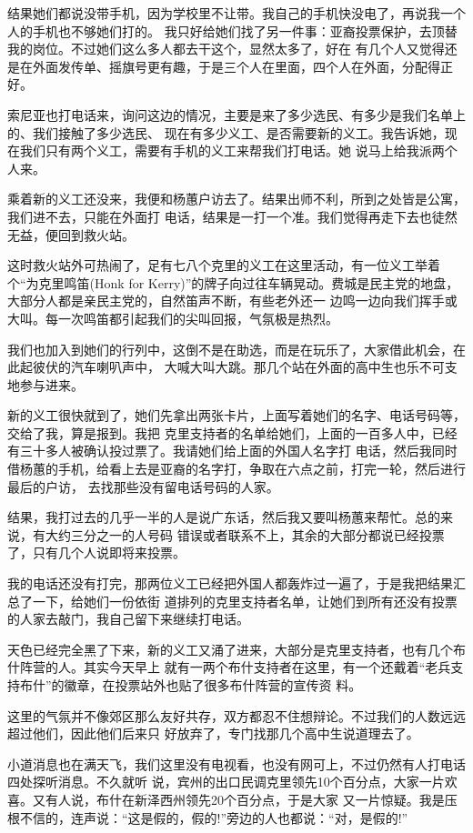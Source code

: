 ﻿\documentclass[11pt]{article}
\begin{document}
结果她们都说没带手机，因为学校里不让带。我自己的手机快没电了，再说我一个人的手机也不够她们打的。
我只好给她们找了另一件事：亚裔投票保护，去顶替我的岗位。不过她们这么多人都去干这个，显然太多了，好在
有几个人又觉得还是在外面发传单、摇旗号更有趣，于是三个人在里面，四个人在外面，分配得正好。

索尼亚也打电话来，询问这边的情况，主要是来了多少选民、有多少是我们名单上的、我们接触了多少选民、
现在有多少义工、是否需要新的义工。我告诉她，现在我们只有两个义工，需要有手机的义工来帮我们打电话。她
说马上给我派两个人来。

乘着新的义工还没来，我便和杨蕙户访去了。结果出师不利，所到之处皆是公寓，我们进不去，只能在外面打
电话，结果是一打一个准。我们觉得再走下去也徒然无益，便回到救火站。

这时救火站外可热闹了，足有七八个克里的义工在这里活动，有一位义工举着个``为克里鸣笛(Honk for
Kerry)''的牌子向过往车辆晃动。费城是民主党的地盘，大部分人都是亲民主党的，自然笛声不断，有些老外还一
边鸣一边向我们挥手或大叫。每一次鸣笛都引起我们的尖叫回报，气氛极是热烈。


我们也加入到她们的行列中，这倒不是在助选，而是在玩乐了，大家借此机会，在此起彼伏的汽车喇叭声中，
大喊大叫大跳。那几个站在外面的高中生也乐不可支地参与进来。

新的义工很快就到了，她们先拿出两张卡片，上面写着她们的名字、电话号码等，交给了我，算是报到。我把
克里支持者的名单给她们，上面的一百多人中，已经有三十多人被确认投过票了。我请她们给上面的外国人名字打
电话，然后我同时借杨蕙的手机，给看上去是亚裔的名字打，争取在六点之前，打完一轮，然后进行最后的户访，
去找那些没有留电话号码的人家。

结果，我打过去的几乎一半的人是说广东话，然后我又要叫杨蕙来帮忙。总的来说，有大约三分之一的人号码
错误或者联系不上，其余的大部分都说已经投票了，只有几个人说即将来投票。

我的电话还没有打完，那两位义工已经把外国人都轰炸过一遍了，于是我把结果汇总了一下，给她们一份依街
道排列的克里支持者名单，让她们到所有还没有投票的人家去敲门，我自己留下来继续打电话。

天色已经完全黑了下来，新的义工又涌了进来，大部分是克里支持者，也有几个布什阵营的人。其实今天早上
就有一两个布什支持者在这里，有一个还戴着``老兵支持布什''的徽章，在投票站外也贴了很多布什阵营的宣传资
料。

这里的气氛并不像郊区那么友好共存，双方都忍不住想辩论。不过我们的人数远远超过他们，因此他们后来只
好放弃了，专门找那几个高中生说道理去了。

小道消息也在满天飞，我们这里没有电视看，也没有网可上，不过仍然有人打电话四处探听消息。不久就听
说，宾州的出口民调克里领先10个百分点，大家一片欢喜。又有人说，布什在新泽西州领先20个百分点，于是大家
又一片惊疑。我是压根不信的，连声说：``这是假的，假的!''旁边的人也都说：``对，是假的!''
\end{document}
